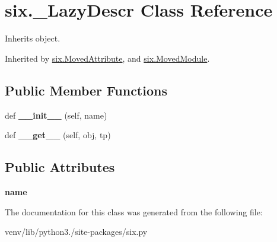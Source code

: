 \hypertarget{classsix_1_1___lazy_descr}{}\section{six.\+\_\+\+Lazy\+Descr Class Reference}
\label{classsix_1_1___lazy_descr}


Inherits object.



Inherited by \hyperlink{classsix_1_1_moved_attribute}{six.\+Moved\+Attribute}, and \hyperlink{classsix_1_1_moved_module}{six.\+Moved\+Module}.

\subsection*{Public Member Functions}
\begin{DoxyCompactItemize}
\item 
\mbox{\label{classsix_1_1___lazy_descr_a36b331b4c5406cb9737933449dafba71}} 
def {\bfseries \+\_\+\+\_\+init\+\_\+\+\_\+} (self, name)
\item 
\mbox{\label{classsix_1_1___lazy_descr_a55983d01a267a05c04d166df35a8f8fe}} 
def {\bfseries \+\_\+\+\_\+get\+\_\+\+\_\+} (self, obj, tp)
\end{DoxyCompactItemize}
\subsection*{Public Attributes}
\begin{DoxyCompactItemize}
\item 
\mbox{\label{classsix_1_1___lazy_descr_ad45b705c0f4b63da8bcd1311527b2591}} 
{\bfseries name}
\end{DoxyCompactItemize}


The documentation for this class was generated from the following file\+:\begin{DoxyCompactItemize}
\item 
venv/lib/python3./site-\/packages/six.\+py\end{DoxyCompactItemize}
